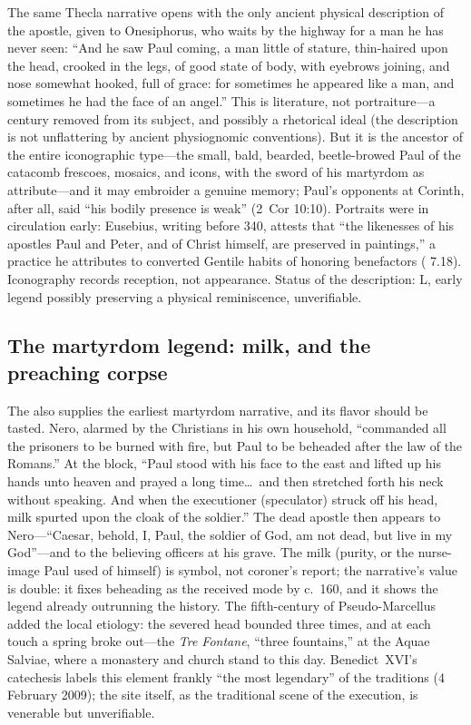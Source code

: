 The same Thecla narrative opens with the only ancient physical description
of the apostle, given to Onesiphorus, who waits by the highway for a man
he has never seen: ``And he saw Paul coming, a man little of stature,
thin-haired upon the head, crooked in the legs, of good state of body,
with eyebrows joining, and nose somewhat hooked, full of grace: for
sometimes he appeared like a man, and sometimes he had the face of an
angel.'' This is literature, not portraiture---a century removed from its
subject, and possibly a rhetorical ideal (the description is not
unflattering by ancient physiognomic conventions). But it is the ancestor
of the entire iconographic type---the small, bald, bearded,
beetle-browed Paul of the catacomb frescoes, mosaics, and icons, with the
sword of his martyrdom as attribute---and it may embroider a genuine
memory; Paul's opponents at Corinth, after all, said ``his bodily
presence is weak'' (2~Cor 10:10). Portraits were in circulation early:
Eusebius, writing before 340, attests that ``the likenesses of his
apostles Paul and Peter, and of Christ himself, are preserved in
paintings,'' a practice he attributes to converted Gentile habits of
honoring benefactors ( 7.18). Iconography records
reception, not appearance. Status of the description: L, early legend
possibly preserving a physical reminiscence, unverifiable.

\subsection{The martyrdom legend: milk, and the preaching corpse}

The  also supplies the earliest martyrdom narrative,
and its flavor should be tasted. Nero, alarmed by the Christians in his
own household, ``commanded all the prisoners to be burned with fire, but
Paul to be beheaded after the law of the Romans.'' At the block, ``Paul
stood with his face to the east and lifted up his hands unto heaven and
prayed a long time\ldots\ and then stretched forth his neck without
speaking. And when the executioner (speculator) struck off his head, milk
spurted upon the cloak of the soldier.'' The dead apostle then appears to
Nero---``Caesar, behold, I, Paul, the soldier of God, am not dead, but
live in my God''---and to the believing officers at his grave. The milk
(purity, or the nurse-image Paul used of himself) is symbol, not
coroner's report; the narrative's value is double: it fixes beheading as
the received mode by c.~160, and it shows the legend already outrunning
the history. The fifth-century  of
Pseudo-Marcellus added the local etiology: the severed head bounded three
times, and at each touch a spring broke out---the \textit{Tre Fontane},
``three fountains,'' at the Aquae Salviae, where a monastery and church
stand to this day. Benedict~XVI's catechesis labels this element frankly
``the most legendary'' of the traditions (4 February 2009); the site
itself, as the traditional scene of the execution, is venerable but
unverifiable.

